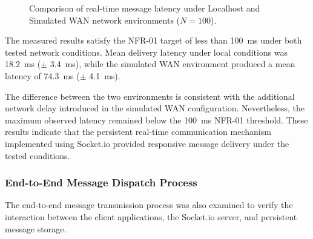 \documentclass[12pt, a4paper]{article}
\begin{document}
\begin{figure}[htbp]
\centering


\caption{Comparison of real-time message latency under Localhost and Simulated WAN network environments ($N=100$).}
\label{fig:latency_chart}
\end{figure}

The measured results satisfy the NFR-01 target of less than 100~ms under both tested network conditions. Mean delivery latency under local conditions was 18.2~ms ($\pm$ 3.4~ms), while the simulated WAN environment produced a mean latency of 74.3~ms ($\pm$ 4.1~ms).

The difference between the two environments is consistent with the additional network delay introduced in the simulated WAN configuration. Nevertheless, the maximum observed latency remained below the 100~ms NFR-01 threshold. These results indicate that the persistent real-time communication mechanism implemented using Socket.io provided responsive message delivery under the tested conditions.

\subsubsection{End-to-End Message Dispatch Process}

The end-to-end message transmission process was also examined to verify the interaction between the client applications, the Socket.io server, and persistent message storage.
\end{document}

